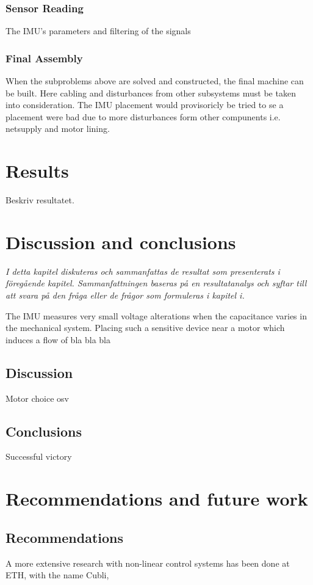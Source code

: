 \documentclass[a4paper,11pt]{kth-mag}
\begin{document}
\subsection{Sensor Reading}
The IMU's parameters and filtering of the signals

\subsection{Final Assembly}
When the subproblems above are solved and constructed, the final machine can be built. Here cabling and disturbances from other subsystems must be taken into consideration. 
The IMU placement would provisoricly be tried to se a placement were bad due to more disturbances form other compunents i.e. netsupply and motor lining.





\chapter{Results}
Beskriv resultatet. 

\chapter{Discussion and conclusions}
\emph{I detta kapitel diskuteras och sammanfattas de resultat som presenterats i föregående kapitel. Sammanfattningen baseras på en resultatanalys och syftar till att svara på den fråga eller de frågor som formuleras i kapitel i.}

The IMU measures very small voltage alterations when the capacitance varies in the mechanical system. Placing such a sensitive device near a motor which induces a flow of bla bla bla

\section{Discussion}
Motor choice osv

\section{Conclusions}
Successful victory


\chapter{Recommendations and future work}

\section{Recommendations}
A more extensive research with non-linear control systems has been done at ETH, with the name Cubli,\cite{cubliECC13}
\end{document}
